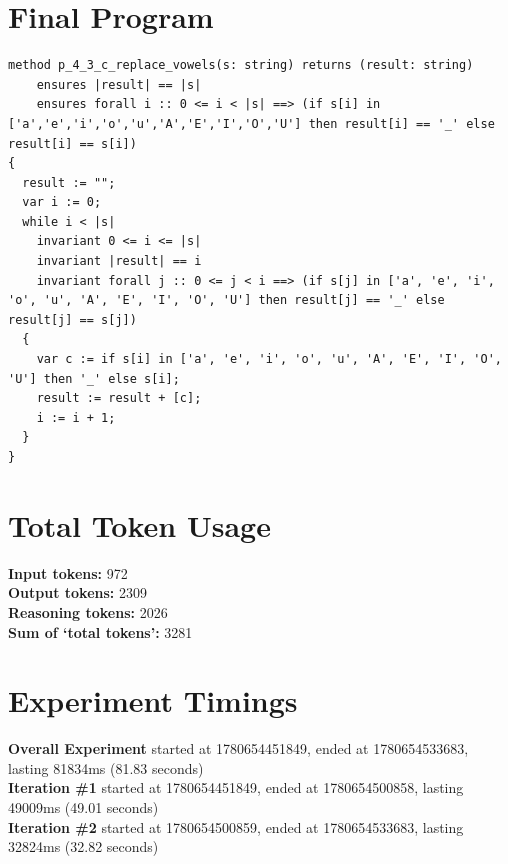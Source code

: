 \documentclass{article}
\begin{document}
\section*{Final Program}
\begin{lstlisting}
method p_4_3_c_replace_vowels(s: string) returns (result: string)
	ensures |result| == |s|
	ensures forall i :: 0 <= i < |s| ==> (if s[i] in ['a','e','i','o','u','A','E','I','O','U'] then result[i] == '_' else result[i] == s[i])
{
  result := "";
  var i := 0;
  while i < |s|
    invariant 0 <= i <= |s|
    invariant |result| == i
    invariant forall j :: 0 <= j < i ==> (if s[j] in ['a', 'e', 'i', 'o', 'u', 'A', 'E', 'I', 'O', 'U'] then result[j] == '_' else result[j] == s[j])
  {
    var c := if s[i] in ['a', 'e', 'i', 'o', 'u', 'A', 'E', 'I', 'O', 'U'] then '_' else s[i];
    result := result + [c];
    i := i + 1;
  }
}
\end{lstlisting}
\section*{Total Token Usage}
\textbf{Input tokens: }972
\\\textbf{Output tokens: }2309
\\\textbf{Reasoning tokens: }2026
\\\textbf{Sum of `total tokens': }3281
\section*{Experiment Timings}
\textbf{Overall Experiment} started at 1780654451849, ended at 1780654533683, lasting 81834ms (81.83 seconds)
\\\textbf{Iteration \#1} started at 1780654451849, ended at 1780654500858, lasting 49009ms (49.01 seconds)
\\\textbf{Iteration \#2} started at 1780654500859, ended at 1780654533683, lasting 32824ms (32.82 seconds)
\end{document}
